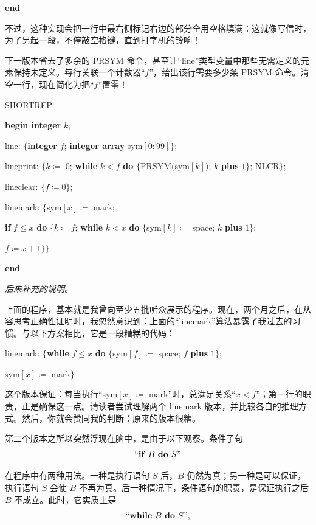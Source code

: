 \documentclass[twoside,11pt,fontset=none]{ctexbook}
\begin{document}
\noindent
\textbf{end}

不过，这种实现会把一行中最右侧标记右边的部分全用空格填满：这就像写信时，为了另起一段，不停敲空格键，直到打字机的铃响！

下一版本省去了多余的 PRSYM 命令，甚至让“line”类型变量中那些无需定义的元素保持未定义。每行关联一个计数器“$f$”，给出该行需要多少条 PRSYM 命令。清空一行，现在简化为把“$f$”置零！

\noindent
SHORTREP

\noindent
\textbf{begin integer} $k$;

\noindent
\quad line: $\{$\textbf{integer} $f$; \textbf{integer array} sym$[0 : 99]\}$;

\noindent
\quad lineprint: $\{k \coloneq$ 0; \textbf{while} $k < f$ \textbf{do} $\{$PRSYM$($sym$[k])$; $k$ \textbf{plus} $1\}$; NLCR$\}$;

\noindent
\quad lineclear: $\{f \coloneq 0\}$;

\noindent
\quad linemark: $\{$sym$[x] \coloneq$ mark;

\noindent
\quad \textbf{if} $f \leqslant x$ \textbf{do} $\{k \coloneq f$; \textbf{while} $k < x$ \textbf{do} $\{$sym$[k] \coloneq$ space; $k$ \textbf{plus} $1\}$;

\noindent
\quad \quad $f \coloneq x + 1\}\}$

\noindent
\textbf{end}

\noindent
\textit{后来补充的说明。}

上面的程序，基本就是我曾向至少五批听众展示的程序。现在，两个月之后，在从容思考正确性证明时，我忽然意识到：上面的“linemark”算法暴露了我过去的习惯。与以下方案相比，它是一段糟糕的代码：

linemark: $\{$\textbf{while} $f \leqslant x$ \textbf{do} $\{$sym$[f] \coloneq$ space; $f$ \textbf{plus} $1\};$
	
\quad sym$[x] \coloneq$ mark$\}$

\noindent
这个版本保证：每当执行“sym$[x] \coloneq$ mark”时，总满足关系“$x < f$”；第一行的职责，正是确保这一点。请读者尝试理解两个 linemark 版本，并比较各自的推理方式。然后，你就会赞同我的判断：原来的版本很糟。

第二个版本之所以突然浮现在脑中，是由于以下观察。条件子句
$$
\text{``\textbf{if} } B \text{ \textbf{do} } S\text{''}
$$

\noindent
在程序中有两种用法。一种是执行语句 $S$ 后，$B$ 仍然为真；另一种是可以保证，执行语句 $S$ 会使 $B$ 不再为真。后一种情况下，条件语句的职责，是保证执行之后 $B$ 不成立。此时，它实质上是
$$
\text{``\textbf{while} } B \text{ \textbf{do} } S\text{'',}
$$
\end{document}
